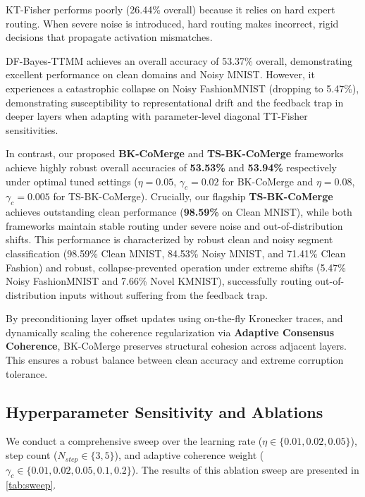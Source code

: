 \documentclass{article}
\theoremstyle{plain}
\theoremstyle{definition}
\theoremstyle{remark}
\begin{document}
KT-Fisher performs poorly (26.44\% overall) because it relies on hard expert routing. When severe noise is introduced, hard routing makes incorrect, rigid decisions that propagate activation mismatches.

DF-Bayes-TTMM achieves an overall accuracy of 53.37\% overall, demonstrating excellent performance on clean domains and Noisy MNIST. However, it experiences a catastrophic collapse on Noisy FashionMNIST (dropping to 5.47\%), demonstrating susceptibility to representational drift and the feedback trap in deeper layers when adapting with parameter-level diagonal TT-Fisher sensitivities.

In contrast, our proposed \textbf{BK-CoMerge} and \textbf{TS-BK-CoMerge} frameworks achieve highly robust overall accuracies of \textbf{53.53\%} and \textbf{53.94\%} respectively under optimal tuned settings ($\eta=0.05$, $\gamma_c=0.02$ for BK-CoMerge and $\eta=0.08$, $\gamma_c=0.005$ for TS-BK-CoMerge). Crucially, our flagship \textbf{TS-BK-CoMerge} achieves outstanding clean performance (\textbf{98.59\%} on Clean MNIST), while both frameworks maintain stable routing under severe noise and out-of-distribution shifts. This performance is characterized by robust clean and noisy segment classification (98.59\% Clean MNIST, 84.53\% Noisy MNIST, and 71.41\% Clean Fashion) and robust, collapse-prevented operation under extreme shifts (5.47\% Noisy FashionMNIST and 7.66\% Novel KMNIST), successfully routing out-of-distribution inputs without suffering from the feedback trap.

By preconditioning layer offset updates using on-the-fly Kronecker traces, and dynamically scaling the coherence regularization via \textbf{Adaptive Consensus Coherence}, BK-CoMerge preserves structural cohesion across adjacent layers. This ensures a robust balance between clean accuracy and extreme corruption tolerance.

\subsection{Hyperparameter Sensitivity and Ablations}
We conduct a comprehensive sweep over the learning rate ($\eta \in \{0.01, 0.02, 0.05\}$), step count ($N_{step} \in \{3, 5\}$), and adaptive coherence weight ($\gamma_c \in \{0.01, 0.02, 0.05, 0.1, 0.2\}$). The results of this ablation sweep are presented in \cref{tab:sweep}.
\end{document}

